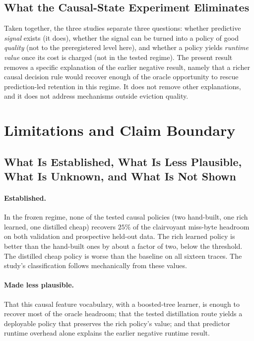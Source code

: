 \documentclass[11pt]{article}
\theoremstyle{plain}
\theoremstyle{definition}
\begin{document}
\subsection{What the Causal-State Experiment Eliminates}
Taken together, the three studies separate three questions: whether predictive \emph{signal} exists (it does), whether the signal can be turned into a policy of good \emph{quality} (not to the preregistered level here), and whether a policy yields \emph{runtime value} once its cost is charged (not in the tested regime). The present result removes a specific explanation of the earlier negative result, namely that a richer causal decision rule would recover enough of the oracle opportunity to rescue prediction-led retention in this regime. It does not remove other explanations, and it does not address mechanisms outside eviction quality.

\section{Limitations and Claim Boundary}
\label{sec:claims}

\subsection{What Is Established, What Is Less Plausible, What Is Unknown, and What Is Not Shown}
\paragraph{Established.} In the frozen regime, none of the tested causal policies (two hand-built, one rich learned, one distilled cheap) recovers $25\%$ of the clairvoyant miss-byte headroom on both validation and prospective held-out data. The rich learned policy is better than the hand-built ones by about a factor of two, below the threshold. The distilled cheap policy is worse than the baseline on all sixteen traces. The study's classification follows mechanically from these values.
\paragraph{Made less plausible.} That this causal feature vocabulary, with a boosted-tree learner, is enough to recover most of the oracle headroom; that the tested distillation route yields a deployable policy that preserves the rich policy's value; and that predictor runtime overhead alone explains the earlier negative runtime result.
\end{document}
